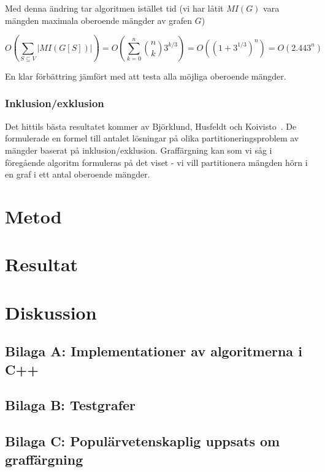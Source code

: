 \documentclass[a4paper]{report}
\begin{document}
Med denna ändring tar algoritmen istället tid (vi har låtit $MI(G)$ vara mängden maximala oberoende mängder av grafen $G$)

$$O(\sum_{S \subseteq V}{|MI(G[S])|}) = O(\sum^n_{k=0}{{n \choose k}3^{k/3}}) = O((1 + 3^{1/3})^n) =  O(2.443^n)$$

En klar förbättring jämfört med att testa alla möjliga oberoende mängder.

\subsection{Inklusion/exklusion}

Det hittils bästa resultatet kommer av Björklund, Husfeldt och Koivisto~\cite{Bjorklund:2009}. De formulerade en formel till antalet lösningar på olika partitioneringsproblem av mängder baserat på inklusion/exklusion. Graffärgning kan som vi såg i föregående algoritm formuleras på det viset - vi vill partitionera mängden hörn i en graf i ett antal oberoende mängder.

\chapter{Metod}

\chapter{Resultat}
\chapter{Diskussion}

\nocite{VanLint:2006}

{}

\section*{Bilaga A: Implementationer av algoritmerna i C++}
\section*{Bilaga B: Testgrafer}
\section*{Bilaga C: Populärvetenskaplig uppsats om graffärgning}
\end{document}
